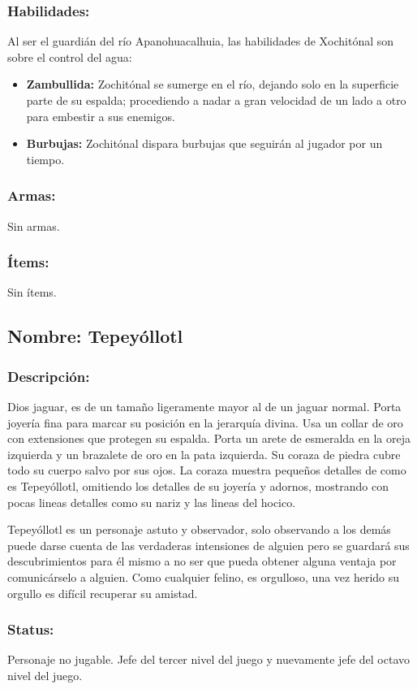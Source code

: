 \documentclass[11pt,letterpaper]{article}
\begin{document}
\subsubsection{Habilidades:}
Al ser el guardián del río  Apanohuacalhuia, las habilidades de Xochitónal son sobre el control del agua:
\begin{itemize}
	\item \textbf{Zambullida:} Zochitónal se sumerge en el río, dejando solo en la superficie parte de su espalda; procediendo a nadar a gran velocidad de un lado a otro para embestir a sus enemigos.  
	\item \textbf{Burbujas:} Zochitónal dispara burbujas que seguirán al jugador por un tiempo. 
\end{itemize}
\subsubsection{Armas:}
Sin armas.
\subsubsection{Ítems:}
Sin ítems.

\subsection{Nombre: Tepeyóllotl}  \label{per.tepeyollotl}
\subsubsection{Descripción:}    
Dios jaguar, es de un tamaño ligeramente mayor al de un jaguar normal. Porta joyería fina para marcar su posición en la jerarquía divina. Usa un collar de oro con extensiones que protegen su espalda. Porta un arete de esmeralda en la oreja izquierda y un brazalete de oro en la pata izquierda. Su coraza de piedra cubre todo su cuerpo salvo por sus ojos. La coraza muestra pequeños detalles de como es Tepeyóllotl, omitiendo los detalles de su joyería y adornos, mostrando con pocas lineas detalles como su nariz y las lineas del hocico.
\\
\par
Tepeyóllotl es un personaje astuto y observador, solo observando a los demás puede darse cuenta de las verdaderas intensiones de alguien pero se guardará sus descubrimientos para él mismo a no ser que pueda obtener alguna ventaja por comunicárselo a alguien. Como cualquier felino, es orgulloso, una vez herido su orgullo es difícil recuperar su amistad. \subsubsection{Status:}
Personaje no jugable.
Jefe del tercer nivel del juego y nuevamente jefe del octavo nivel del juego.
\end{document}
